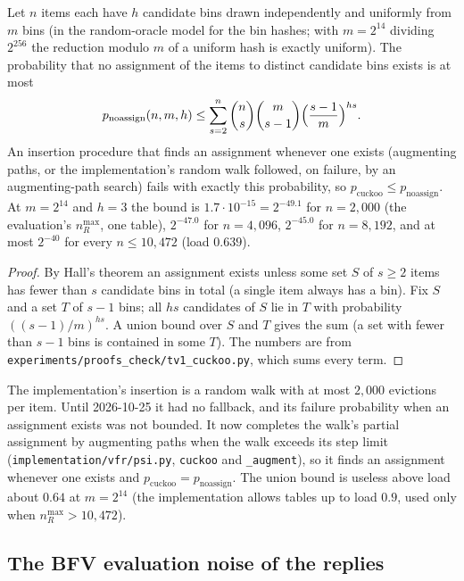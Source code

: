 \begin{lemma}\label{lem:cuckoo}
Let $n$ items each have $h$ candidate bins drawn independently and uniformly from $m$ bins (in the random-oracle model for the bin hashes; with $m=2^{14}$ dividing $2^{256}$ the reduction modulo $m$ of a uniform hash is exactly uniform). The probability that no assignment of the items to distinct candidate bins exists is at most
\[
  p_{\mathrm{noassign}}(n,m,h)\le\sum_{s=2}^{n}\binom ns\binom m{s-1}\Bigl(\frac{s-1}m\Bigr)^{hs}.
\]
An insertion procedure that finds an assignment whenever one exists (augmenting paths, or the implementation's random walk followed, on failure, by an augmenting-path search) fails with exactly this probability, so $p_{\mathrm{cuckoo}}\le p_{\mathrm{noassign}}$. At $m=2^{14}$ and $h=3$ the bound is $1.7\cdot10^{-15}=2^{-49.1}$ for $n=2{,}000$ (the evaluation's $n_R^{\max}$, one table), $2^{-47.0}$ for $n=4{,}096$, $2^{-45.0}$ for $n=8{,}192$, and at most $2^{-40}$ for every $n\le10{,}472$ (load $0.639$).
\end{lemma}
\begin{proof}
By Hall's theorem an assignment exists unless some set $S$ of $s\ge2$ items has fewer than $s$ candidate bins in total (a single item always has a bin). Fix $S$ and a set $T$ of $s-1$ bins; all $hs$ candidates of $S$ lie in $T$ with probability $((s-1)/m)^{hs}$. A union bound over $S$ and $T$ gives the sum (a set with fewer than $s-1$ bins is contained in some $T$). The numbers are from \texttt{experiments/proofs\_check/tv1\_cuckoo.py}, which sums every term.
\end{proof}

\begin{remark}
The implementation's insertion is a random walk with at most $2{,}000$ evictions per item. Until 2026-10-25 it had no fallback, and its failure probability when an assignment exists was not bounded. It now completes the walk's partial assignment by augmenting paths when the walk exceeds its step limit (\texttt{implementation/vfr/psi.py}, \texttt{cuckoo} and \texttt{\_augment}), so it finds an assignment whenever one exists and $p_{\mathrm{cuckoo}}=p_{\mathrm{noassign}}$. The union bound is useless above load about $0.64$ at $m=2^{14}$ (the implementation allows tables up to load $0.9$, used only when $n_R^{\max}>10{,}472$).
\end{remark}

\subsection{The BFV evaluation noise of the replies}

